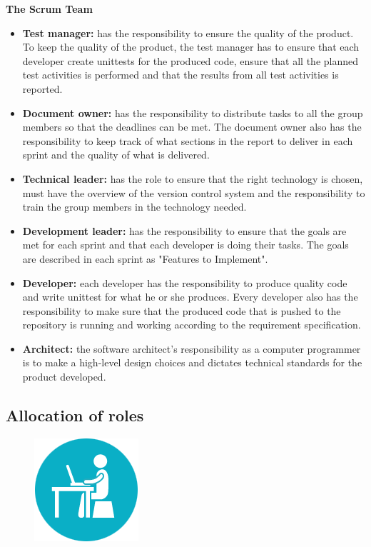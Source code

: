 \noindent
{\bf The Scrum Team}
\begin{itemize}

  \item {\bf Test manager:} has the responsibility to ensure the quality of the product. To keep the quality of the product, the test manager has to ensure that each developer create unittests for the produced code, ensure that all the planned test activities is performed and that the results from all test activities is reported.

  \item {\bf Document owner:} has the responsibility to distribute tasks to all the group members so that the deadlines can be met. The document owner also has the responsibility to keep track of what sections in the report to deliver in each sprint and the quality of what is delivered.

  \item {\bf Technical leader:} has the role to ensure that the right technology is chosen, must have the overview of the version control system and the responsibility to train the group members in the technology needed.

  \item {\bf Development leader:} has the responsibility to ensure that the goals are met for each sprint and that each developer is doing their tasks. The goals are described in each sprint as "Features to Implement". 

  \item {\bf Developer:} each developer has the responsibility to produce quality code and write unittest for what he or she produces. Every developer also has the responsibility to make sure that the produced code that is pushed to the repository is running and working according to the requirement specification.

  \item{\bf Architect:} the software architect's responsibility as a computer programmer is to make a high-level design choices and dictates technical standards for the product developed. \cite{architect}

  \end{itemize} 

\subsection{Allocation of roles}
\begin{figure}
  \begin{center}
  \includegraphics[scale=0.7]{pictures/Work.png}
  \end{center}
\end{figure}


